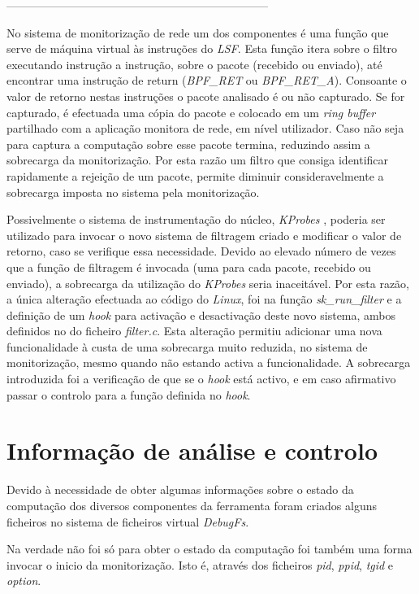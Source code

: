 ---------------------------------------------------------------------

No sistema de monitorização de rede um dos componentes é uma função que serve de máquina virtual às instruções do \textit{LSF}.
Esta função itera sobre o filtro executando instrução a instrução, sobre o pacote (recebido ou enviado), até encontrar uma instrução de return (\textit{BPF\_RET} ou \textit{BPF\_RET\_A}).
Consoante o valor de retorno nestas instruções o pacote analisado é ou não capturado.
Se for capturado, é efectuada uma cópia do pacote e colocado em um \textit{ring buffer} partilhado com a aplicação monitora de rede, em nível utilizador.
Caso não seja para captura a computação sobre esse pacote termina, reduzindo assim a sobrecarga da monitorização.
Por esta razão um filtro que consiga identificar rapidamente a rejeição de um pacote, permite diminuir consideravelmente a sobrecarga imposta no sistema pela monitorização.

Possivelmente o sistema de instrumentação do núcleo, \textit{KProbes} , poderia ser utilizado para invocar o novo sistema de filtragem criado e modificar o valor de retorno, caso se verifique essa necessidade.
Devido ao elevado número de vezes que a função de filtragem é invocada (uma para cada pacote, recebido ou enviado), a sobrecarga da utilização do \textit{KProbes} seria inaceitável.
Por esta razão, a única alteração efectuada ao código do \textit{Linux}, foi na função \textit{sk\_run\_filter} e a definição de um \textit{hook} para activação e desactivação deste novo sistema, ambos definidos no do ficheiro \textit{filter.c}.
Esta alteração permitiu adicionar uma nova funcionalidade à custa de uma sobrecarga muito reduzida, no sistema de monitorização, mesmo quando não estando activa a funcionalidade.
A sobrecarga introduzida foi a verificação de que se o \textit{hook} está activo, e em caso afirmativo passar o controlo para a função definida no \textit{hook}.



\section{Informação de análise e controlo}

Devido à necessidade de obter algumas informações sobre o estado da computação dos diversos componentes da ferramenta foram criados alguns ficheiros no
sistema de ficheiros virtual \textit{DebugFs}.

Na verdade não foi só para obter o estado da computação foi também uma forma invocar o inicio da monitorização.
 Isto é, através dos ficheiros \textit{pid}, \textit{ppid}, \textit{tgid} e \textit{option}. 

